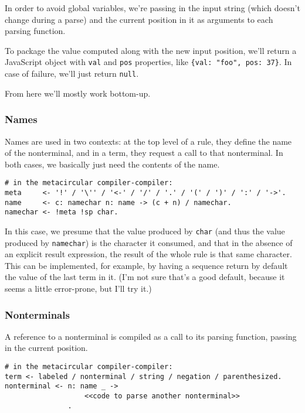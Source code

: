 \documentclass[
]{article}
\begin{document}
In order to avoid global variables, we're passing in the input string
(which doesn't change during a parse) and the current position in it as
arguments to each parsing function.

To package the value computed along with the new input position, we'll
return a JavaScript object with \texttt{val} and \texttt{pos}
properties, like \texttt{\{val:\ "foo",\ pos:\ 37\}}. In case of
failure, we'll just return \texttt{null}.

From here we'll mostly work bottom-up.

\hypertarget{names}{%
\subsubsection{Names}\label{names}}

Names are used in two contexts: at the top level of a rule, they define
the name of the nonterminal, and in a term, they request a call to that
nonterminal. In both cases, we basically just need the contents of the
name.

\begin{verbatim}
# in the metacircular compiler-compiler:
meta     <- '!' / '\'' / '<-' / '/' / '.' / '(' / ')' / ':' / '->'.
name     <- c: namechar n: name -> (c + n) / namechar.
namechar <- !meta !sp char.
\end{verbatim}

In this case, we presume that the value produced by \texttt{char} (and
thus the value produced by \texttt{namechar}) is the character it
consumed, and that in the absence of an explicit result expression, the
result of the whole rule is that same character. This can be
implemented, for example, by having a sequence return by default the
value of the last term in it. (I'm not sure that's a good default,
because it seems a little error-prone, but I'll try it.)

\hypertarget{nonterminals}{%
\subsubsection{Nonterminals}\label{nonterminals}}

A reference to a nonterminal is compiled as a call to its parsing
function, passing in the current position.

\begin{verbatim}
# in the metacircular compiler-compiler:
term <- labeled / nonterminal / string / negation / parenthesized.
nonterminal <- n: name _ ->
                   <<code to parse another nonterminal>>
               .
\end{verbatim}
\end{document}
